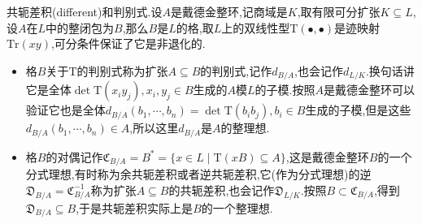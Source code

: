 共轭差积(different)和判别式.设$A$是戴德金整环,记商域是$K$,取有限可分扩张$K\subseteq L$,设$A$在$L$中的整闭包为$B$,那么$B$是$L$的格,取$L$上的双线性型$\mathrm{T}(\bullet,\bullet)$是迹映射$\mathrm{Tr}(xy)$,可分条件保证了它是非退化的.
\begin{itemize}
	\item 格$B$关于$\mathrm{T}$的判别式称为扩张$A\subseteq B$的判别式,记作$d_{B/A}$,也会记作$d_{L/K}$.换句话讲它是全体$\det\mathrm{T}(x_iy_j),x_i,y_j\in B$生成的$A$模$L$的子模.按照$A$是戴德金整环可以验证它也是全体$d_{B/A}(b_1,\cdots,b_n)=\det\mathrm{T}(b_ib_j),b_i\in B$生成的子模,但是这些$d_{B/A}(b_1,\cdots,b_n)\in A$,所以这里$d_{B/A}$是$A$的整理想.
	\item 格$B$的对偶记作$\mathfrak{C}_{B/A}=B^*=\{x\in L\mid\mathrm{T}(xB)\subseteq A\}$,这是戴德金整环$B$的一个分式理想,有时称为余共轭差积或者逆共轭差积,它(作为分式理想)的逆$\mathfrak{D}_{B/A}=\mathfrak{C}_{B/A}^{-1}$称为扩张$A\subseteq B$的共轭差积,也会记作$\mathfrak{D}_{L/K}$.按照$B\subset\mathfrak{C}_{B/A}$,得到$\mathfrak{D}_{B/A}\subseteq B$,于是共轭差积实际上是$B$的一个整理想.
\end{itemize}

